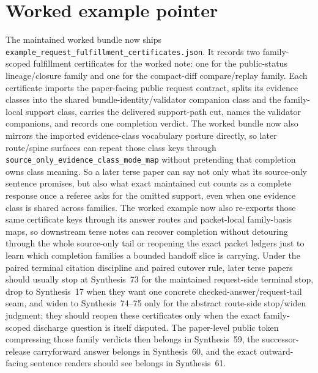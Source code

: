 \documentclass[11pt]{article}
\begin{document}
\section{Worked example pointer}
The maintained worked bundle now ships \nolinkurl{example_request_fulfillment_certificates.json}.\cite{series:workedexample}
It records two family-scoped fulfillment certificates for the worked note: one for the public-status lineage/closure family and one for the compact-diff compare/replay family.
Each certificate imports the paper-facing public request contract, splits its evidence classes into the shared bundle-identity/validator companion class and the family-local support class, carries the delivered support-path cut, names the validator companions, and records one completion verdict. The worked bundle now also mirrors the imported evidence-class vocabulary posture directly, so later route/spine surfaces can repeat those class keys through \nolinkurl{source_only_evidence_class_mode_map} without pretending that completion owns class meaning.
So a later terse paper can say not only what its source-only sentence promises, but also what exact maintained cut counts as a complete response once a referee asks for the omitted support, even when one evidence class is shared across families. The worked example now also re-exports those same certificate keys through its answer routes and packet-local family-basis maps, so downstream terse notes can recover completion without detouring through the whole source-only tail or reopening the exact packet ledgers just to learn which completion families a bounded handoff slice is carrying. Under the paired terminal citation discipline and paired cutover rule, later terse papers should usually stop at Synthesis~73 for the maintained request-side terminal stop, drop to Synthesis~17 when they want one concrete checked-answer/request-tail seam, and widen to Synthesis~74--75 only for the abstract route-side stop/widen judgment; they should reopen these certificates only when the exact family-scoped discharge question is itself disputed. The paper-level public token compressing those family verdicts then belongs in Synthesis~59, the successor-release carryforward answer belongs in Synthesis~60, and the exact outward-facing sentence readers should see belongs in Synthesis~61.\cite{series:requestsideterminalcitationnormalform,series:pairedterminalcitationdiscipline,series:pairedterminalcutoverrules}
\end{document}
